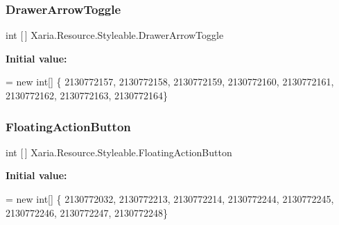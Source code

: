 \subsubsection{\texorpdfstring{Drawer\+Arrow\+Toggle}{DrawerArrowToggle}}
{\footnotesize\ttfamily int \mbox{[}$\,$\mbox{]} Xaria.\+Resource.\+Styleable.\+Drawer\+Arrow\+Toggle\hspace{0.3cm}{\ttfamily [static]}}

{\bfseries Initial value\+:}
\begin{DoxyCode}
= \textcolor{keyword}{new} \textcolor{keywordtype}{int}[] \{
                    2130772157,
                    2130772158,
                    2130772159,
                    2130772160,
                    2130772161,
                    2130772162,
                    2130772163,
                    2130772164\}
\end{DoxyCode}
\mbox{\label{classXaria_1_1Resource_1_1Styleable_accbfd52d9bad9437db9d001459abeb75}} 
\subsubsection{\texorpdfstring{Floating\+Action\+Button}{FloatingActionButton}}
{\footnotesize\ttfamily int \mbox{[}$\,$\mbox{]} Xaria.\+Resource.\+Styleable.\+Floating\+Action\+Button\hspace{0.3cm}{\ttfamily [static]}}

{\bfseries Initial value\+:}
\begin{DoxyCode}
= \textcolor{keyword}{new} \textcolor{keywordtype}{int}[] \{
                    2130772032,
                    2130772213,
                    2130772214,
                    2130772244,
                    2130772245,
                    2130772246,
                    2130772247,
                    2130772248\}
\end{DoxyCode}
\mbox{\label{classXaria_1_1Resource_1_1Styleable_aa39b14b171a100c0499d86308ce48c98}} 
